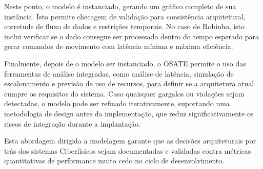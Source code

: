 Neste ponto, o modelo é instanciado, gerando um gráfico completo de sua instância. Isto permite checagem de validação para consistência arquitetural, corretude de fluxo de dados e restrições temporais. No caso de Robinho, isto inclui verificar se o dado consegue ser processado dentro do tempo esperado para gerar comandos de movimento com latência mínima e máxima eficiência.

Finalmente, depois de o modelo ser instanciado, o OSATE permite o uso das ferramentas de análise integradas, como análise de latência, simulação de escalonamento e previsão de uso de recursos, para definir se a arquitetura atual cumpre os requisitos do sistema. Caso quaisquer gargalos ou violações sejam detectadas, o modelo pode ser refinado iterativamente, suportando uma metodologia de design antes da implementação, que reduz significativamente os riscos de integração durante a implantação.

Esta abordagem dirigida a modelagem garante que as decisões arquiteturais por trás dos sistemas Ciberfísicos sejam documentadas e validadas contra métricas quantitativas de performance muito cedo no ciclo de desenvolvimento.